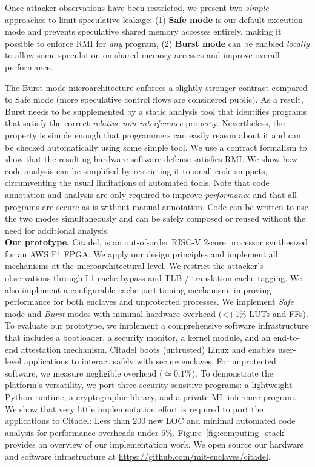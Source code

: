 Once attacker observations have been restricted, we present two \emph{simple} approaches to limit speculative leakage: (1) {\bf Safe mode} is our default execution mode and prevents speculative shared memory accesses entirely, making it possible to enforce RMI for \emph{any} program, (2) {\bf Burst mode} can be enabled \emph{locally} to allow some speculation on shared memory accesses and improve overall performance. 

The Burst mode microarchitecture enforces a slightly stronger contract compared to Safe mode (more speculative control flows are considered public).
As a result, Burst needs to be supplemented by a static analysis tool that identifies programs that satisfy the correct \emph{relative non-interference} property.
Nevertheless, the property is simple enough that programmers can easily reason about it and can be checked automatically using some simple tool.
We use a contract formalism to show that the resulting hardware-software defense satisfies RMI.
We show how code analysis can be simplified by restricting it to small code snippets, circumventing the usual limitations of automated tools.
Note that code annotation and analysis are only required to improve \emph{performance} and that all programs are secure as is without manual annotation.
Code can be written to use the two modes simultaneously and can be safely composed or reused without the need for additional analysis. 
\\

\textbf{Our prototype.} Citadel, is an out-of-order RISC-V 2-core processor synthesized for an AWS F1 FPGA.
We apply our design principles and implement all mechanisms at the microarchitectural level.
We restrict the attacker's observations through L1-cache bypass and TLB / translation cache tagging.
We also implement a configurable cache partitioning mechanism, improving performance for both enclaves and unprotected processes.
We implement \emph{Safe} mode and \emph{Burst} modes with minimal hardware overhead (<+1\% LUTs and FFs).
To evaluate our prototype, we implement a comprehensive software infrastructure that includes a bootloader, a security monitor, a kernel module, and an end-to-end attestation mechanism.
Citadel boots (untrusted) Linux and enables user-level applications to interact safely with secure enclaves.
For unprotected software, we measure negligible overhead ($\simeq0.1\%$).
To demonstrate the platform's versatility, we port three security-sensitive programs: a lightweight Python runtime, a cryptographic library, and a private ML inference program.
We show that very little implementation effort is required to port the applications to Citadel: Less than $200$ new LOC and minimal automated code analysis for performance overheads under $5\%$.
Figure~\ref{fig:computing_stack} provides an overview of our implementation work.
We open source our hardware and software infrastructure at \url{https://github.com/mit-enclaves/citadel}.

